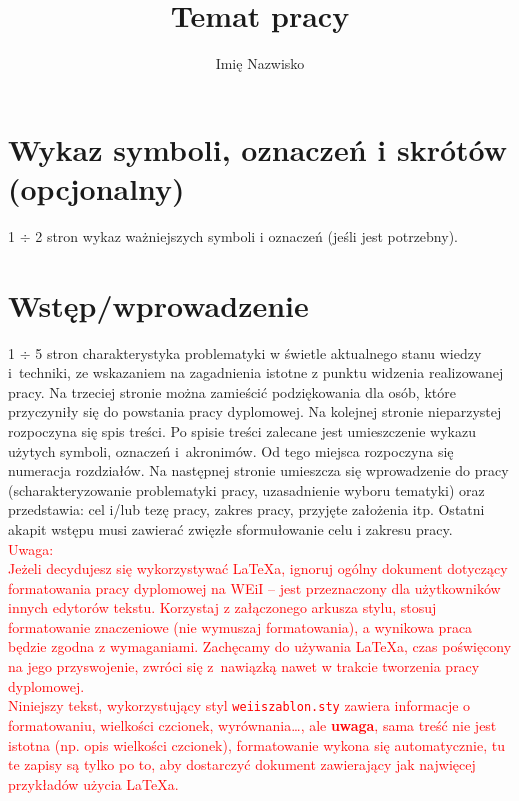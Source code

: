 \documentclass[12pt,twoside,openright]{article}
\author{Imię Nazwisko}
\title{Temat pracy}
\begin{document}
\maketitle

\cleardoublepage

\tableofcontents

\cleardoublepage



\section*{Wykaz symboli, oznaczeń i skrótów (opcjonalny)}
%

1 $\div$ 2 stron wykaz ważniejszych symboli i oznaczeń (jeśli jest potrzebny).

\section{Wstęp/wprowadzenie}
1 $\div$ 5 stron charakterystyka problematyki w świetle aktualnego stanu wiedzy i~techniki, ze wskazaniem na zagadnienia istotne z punktu widzenia realizowanej pracy.
Na trzeciej stronie można zamieścić podziękowania dla osób, które przyczyniły się do powstania pracy dyplomowej.
Na kolejnej stronie nieparzystej rozpoczyna się spis treści.
Po spisie treści zalecane jest umieszczenie wykazu użytych symboli, oznaczeń i~akronimów.
Od tego miejsca rozpoczyna się numeracja rozdziałów.
Na następnej stronie umieszcza się wprowadzenie do pracy (scharakteryzowanie problematyki pracy, uzasadnienie wyboru tematyki) oraz przedstawia: cel i/lub tezę pracy, zakres pracy, przyjęte założenia itp.
Ostatni akapit wstępu musi zawierać zwięzłe sformułowanie celu i zakresu pracy. 
\\
\textcolor{red}{
Uwaga: \\
Jeżeli decydujesz się wykorzystywać \LaTeX{}a, ignoruj ogólny dokument dotyczący formatowania pracy dyplomowej na WEiI -- jest przeznaczony dla użytkowników innych edytorów tekstu. Korzystaj z załączonego arkusza stylu, stosuj formatowanie znaczeniowe (nie wymuszaj formatowania), a wynikowa praca będzie zgodna z wymaganiami.
Zachęcamy do używania \LaTeX{}a, czas poświęcony na jego przyswojenie, zwróci się z~nawiązką nawet w trakcie tworzenia pracy dyplomowej. \\
Niniejszy tekst, wykorzystujący  styl \texttt{weiiszablon.sty} zawiera informacje o formatowaniu, wielkości czcionek, wyrównania\ldots, ale \textbf{uwaga}, sama treść nie jest istotna (np. opis wielkości czcionek), 
formatowanie wykona się automatycznie, tu te zapisy są tylko po to, aby dostarczyć dokument zawierający jak najwięcej przykładów użycia \LaTeX{}a.
}
\end{document}
